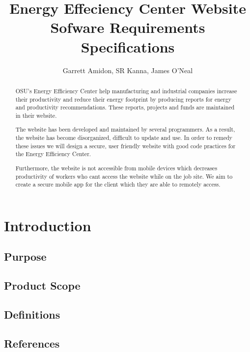 \documentclass[letterpaper,10pt,titlepage,draftclsnofoot,onecolumn]{IEEEtran}
\title{Energy Effeciency Center Website \\
	\large Sofware Requirements Specifications}
\author{Garrett Amidon, SR Kanna, James O'Neal}
\begin{document}
\begin{titlingpage}
    \maketitle
	\centering{}
    \begin{abstract}
        OSU’s Energy Efficiency Center help manufacturing and industrial companies increase their productivity and reduce their energy footprint by producing reports for energy and productivity recommendations. These reports, projects and funds are maintained in their website.\newline

		The website has been developed and maintained by several programmers. As a result, the website has become disorganized, difficult to update and use. In order to remedy these issues we will design a secure, user friendly website with good code practices for the Energy Efficiency Center.\newline

		Furthermore, the website is not accessible from mobile devices which decreases productivity of workers who cant access the website while on the job site. We aim to create a secure mobile app for the client which they are able to remotely access.
    \end{abstract}
\end{titlingpage}

\newpage

\tableofcontents{}

\newpage

\section{Introduction}

\subsection{Purpose}

\subsection{Product Scope}

\subsection{Definitions}

\subsection{References}
\end{document}

